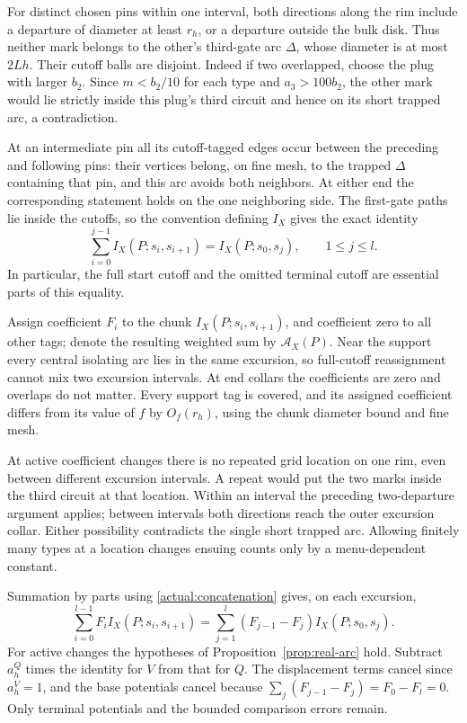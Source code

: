 For distinct chosen pins within one interval, both directions along
the rim include a departure of diameter at least $r_h$, or a
departure outside the bulk disk.  Thus neither mark belongs to the
other's third-gate arc $\Delta$, whose diameter is at most $2Lh$.
Their cutoff balls are disjoint.  Indeed if two overlapped, choose
the plug with larger $b_2$.  Since $m<b_2/10$ for each type and
$a_3>100b_2$, the other mark would lie strictly inside this plug's
third circuit and hence on its short trapped arc, a contradiction.

At an intermediate pin all its cutoff-tagged edges occur between
the preceding and following pins: their vertices belong, on fine
mesh, to the trapped $\Delta$ containing that pin, and this arc
avoids both neighbors.  At either end the corresponding statement
holds on the one neighboring side.  The first-gate paths lie inside
the cutoffs, so the convention defining $I_X$ gives the exact identity
\begin{equation}\label{actual:concatenation}
 \sum_{i=0}^{j-1}I_X(P;s_i,s_{i+1})=I_X(P;s_0,s_j),
                      \qquad 1\le j\le l.
\end{equation}
In particular, the full start cutoff and the omitted terminal cutoff
are essential parts of this equality.

Assign coefficient $F_i$ to the chunk $I_X(P;s_i,s_{i+1})$, and
coefficient zero to all other tags; denote the resulting weighted
sum by $\mathcal A_X(P)$.  Near the support every central isolating
arc lies in the same excursion, so full-cutoff reassignment cannot
mix two excursion intervals.  At end collars the coefficients are
zero and overlaps do not matter.  Every support tag is covered,
and its assigned coefficient differs from its value of $f$ by
$O_f(r_h)$, using the chunk diameter bound and fine mesh.

At active coefficient changes there is no repeated grid location
on one rim, even between different excursion intervals.  A repeat
would put the two marks inside the third circuit at that location.
Within an interval the preceding two-departure argument applies;
between intervals both directions reach the outer excursion collar.
Either possibility contradicts the single short trapped arc.
Allowing finitely many types at a location changes ensuing counts
only by a menu-dependent constant.

Summation by parts using \eqref{actual:concatenation} gives, on each
excursion,
\[
 \sum_{i=0}^{l-1}F_iI_X(P;s_i,s_{i+1})
       =\sum_{j=1}^{l}(F_{j-1}-F_j)I_X(P;s_0,s_j).
\]
For active changes the hypotheses of Proposition~\ref{prop:real-arc}
hold.  Subtract $a_h^Q$ times the identity for $V$ from that for
$Q$.  The displacement terms cancel since $a_h^V=1$, and the base
potentials cancel because
$\sum_j(F_{j-1}-F_j)=F_0-F_l=0$.  Only terminal potentials and
the bounded comparison errors remain.

